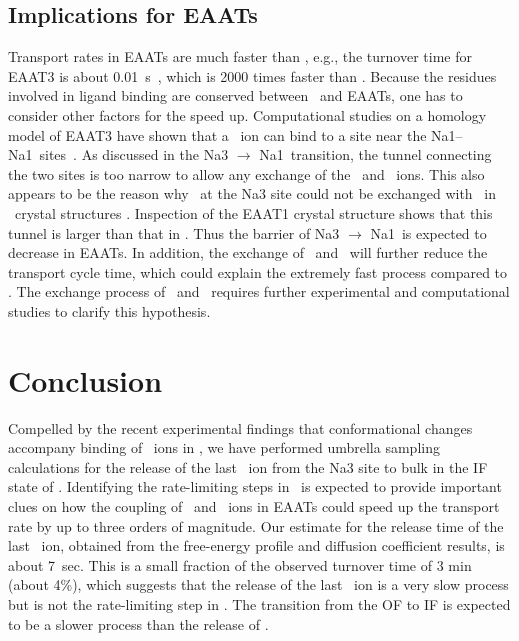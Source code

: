 \subsection{Implications for EAATs}
Transport rates in EAATs are much faster than \GltPh, e.g., the turnover time for EAAT3 is about 
0.01~s~\cite{Grewer2000}, which is 2000 times faster than \GltPh. Because the residues involved 
in ligand binding are conserved between \GltPh\ and EAATs, one has to consider other factors 
for the speed up. Computational studies on a homology model of EAAT3 have shown that a \K\ ion 
can bind to a site near the Na1\prim--Na1\dprim\ sites~\cite{Heinzelmann2014,Heinzelmann2014a}. 
As discussed in the Na3 $\rightarrow$ Na1\prim\ transition, the tunnel connecting the two sites 
is too narrow to allow any exchange of the \Na\ and \K\ ions. This also appears to be the reason 
why \Na\ at the Na3 site could not be exchanged with \Tl\ in \GltPh\ crystal structures 
\cite{Boudker2007,Reyes2009}. Inspection of the EAAT1 crystal structure \cite{Canul-Tec2017} shows 
that this tunnel is larger than that in \GltPh. Thus the barrier of Na3 $\rightarrow$ Na1\prim\ 
is expected to decrease in EAATs. In addition, the exchange of \K\ and \Na\ will further reduce 
the transport cycle time, which could explain the extremely fast process compared to \GltPh. 
The exchange process of \Na\ and \K\ requires further experimental and computational studies to 
clarify this hypothesis. 

\section{Conclusion}
Compelled by the recent experimental findings that conformational changes accompany binding of \Na\ 
ions in \GltPh, we have performed umbrella sampling calculations for the release of the last \Na\ 
ion from the Na3 site to bulk in the IF state of \GltPh. Identifying the rate-limiting steps in \GltPh\ 
is expected to provide important clues on how the coupling of \Hi\ and \Na\ ions in EAATs could speed up the 
transport rate by up to three orders of magnitude. Our estimate for the release time of the last \Na\ 
ion, obtained from the free-energy profile and diffusion coefficient results, is about 7~sec. This is 
a small fraction of the observed turnover time of 3 min (about 4\%), which suggests that the release 
of the last \Na\ ion is a very slow process but is not the rate-limiting step in \GltPh. The transition 
from the OF to IF is expected to be a slower process than the release of \Na.

